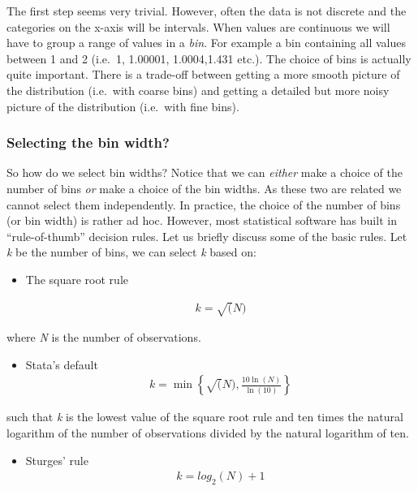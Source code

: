 \documentclass[]{book}
\providecommand{\tightlist}{%
  \setlength{\itemsep}{0pt}\setlength{\parskip}{0pt}}
\begin{document}
The first step seems very trivial. However, often the data is not discrete and the categories on the x-axis will be intervals. When values are continuous we will have to group a range of values in a \emph{bin}. For example a bin containing all values between 1 and 2 (i.e.~1, 1.00001, 1.0004,1.431 etc.). The choice of bins is actually quite important. There is a trade-off between getting a more smooth picture of the distribution (i.e.~with coarse bins) and getting a detailed but more noisy picture of the distribution (i.e.~with fine bins).

\hypertarget{selecting-the-bin-width}{%
\subsubsection*{Selecting the bin width?}\label{selecting-the-bin-width}}

So how do we select bin widths? Notice that we can \emph{either} make a choice of the number of bins \emph{or} make a choice of the bin widths. As these two are related we cannot select them independently. In practice, the choice of the number of bins (or bin width) is rather ad hoc. However, most statistical software has built in ``rule-of-thumb'' decision rules. Let us briefly discuss some of the basic rules. Let \emph{k} be the number of bins, we can select \emph{k} based on:

\begin{itemize}
\item
  The square root rule

  \begin{align}
        k=\sqrt(N)
    \end{align}
\end{itemize}

where \emph{N} is the number of observations.

\begin{itemize}
\tightlist
\item
  Stata's default
  \begin{align}
        k=\min\left\{\sqrt(N), \frac{10\ln(N)}{\ln(10)}\right\}
    \end{align}
\end{itemize}

such that \emph{k} is the lowest value of the square root rule and ten times the natural logarithm of the number of observations divided by the natural logarithm of ten.

\begin{itemize}
\tightlist
\item
  Sturges' rule
  \begin{align}
        k=log_2(N)+1
    \end{align}
\end{itemize}
\end{document}
